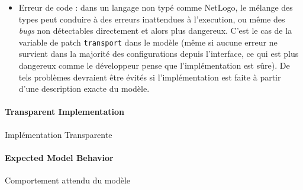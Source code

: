 {\begin{itemize}
\item Erreur de code : dans un langage non typé comme NetLogo, le mélange des types peut conduire à des erreurs inattendues à l'execution, ou même des \emph{bugs} non détectables directement et alors plus dangereux. C'est le cas de la variable de patch \texttt{transport} dans le modèle (même si aucune erreur ne survient dans la majorité des configurations depuis l'interface, ce qui est plus dangereux comme le développeur pense que l'implémentation est sûre). De tels problèmes devraient être évités si l'implémentation est faite à partir d'une description exacte du modèle.
\end{itemize}
}

\paragraph{Transparent Implementation}{Implémentation Transparente}



\paragraph{Expected Model Behavior}{Comportement attendu du modèle}


